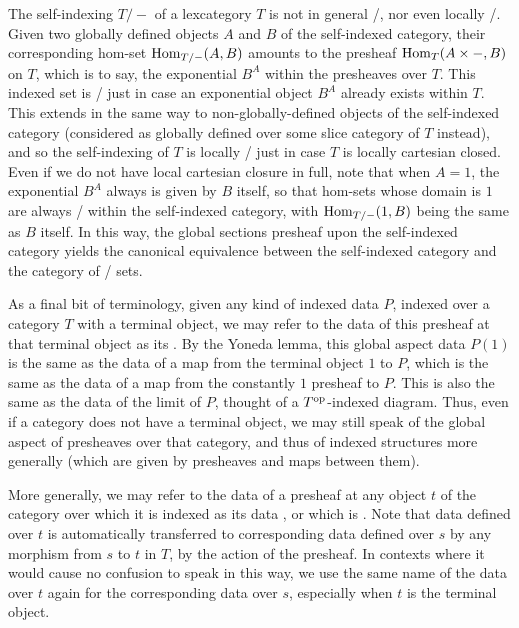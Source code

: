 The self-indexing $T/-$ of a lexcategory $T$ is not in general \repsmall/, nor even locally \repsmall/. Given two globally defined objects $A$ and $B$ of the self-indexed category, their corresponding hom-set $\operatorname{Hom}_{T/-}(A, B)$ amounts to the presheaf $\operatorname{Hom}_{T}(A \times -, B)$ on $T$, which is to say, the exponential $B^A$ within the presheaves over $T$. This indexed set is \repsmall/ just in case an exponential object $B^A$ already exists within $T$. This extends in the same way to non-globally-defined objects of the self-indexed category (considered as globally defined over some slice category of $T$ instead), and so the self-indexing of $T$ is locally \repsmall/ just in case $T$ is locally cartesian closed. Even if we do not have local cartesian closure in full, note that when $A = 1$, the exponential $B^A$ always is given by $B$ itself, so that hom-sets whose domain is $1$ are always \repsmall/ within the self-indexed category, with $\operatorname{Hom}_{T/-}(1, B)$ being the same as $B$ itself. In this way, the global sections presheaf upon the self-indexed category yields the canonical equivalence between the self-indexed category and the category of \repsmall/ sets.

\begin{definition}
As a final bit of terminology, given any kind of indexed data $P$, indexed over a category $T$ with a terminal object, we may refer to the data of this presheaf at that terminal object as its . By the Yoneda lemma, this global aspect data $P(1)$ is the same as the data of a map from the terminal object $1$ to $P$, which is the same as the data of a map from the constantly $1$ presheaf to $P$. This is also the same as the data of the limit of $P$, thought of a $T^{\mathrm{op}}$-indexed diagram. Thus, even if a category does not have a terminal object, we may still speak of the global aspect of presheaves over that category, and thus of indexed structures more generally (which are given by presheaves and maps between them).
\end{definition}


\begin{definition}
More generally, we may refer to the data of a presheaf at any object $t$ of the category over which it is indexed as its data , or which is . Note that data defined over $t$ is automatically transferred to corresponding data defined over $s$ by any morphism from $s$ to $t$ in $T$, by the action of the presheaf. In contexts where it would cause no confusion to speak in this way, we use the same name of the data over $t$ again for the corresponding data over $s$, especially when $t$ is the terminal object.
\end{definition}

